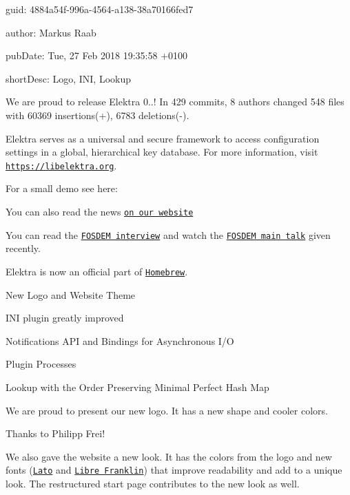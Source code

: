 
\begin{DoxyItemize}
\item guid\+: 4884a54f-\/996a-\/4564-\/a138-\/38a70166fed7
\item author\+: Markus Raab
\item pub\+Date\+: Tue, 27 Feb 2018 19\+:35\+:58 +0100
\item short\+Desc\+: Logo, I\+NI, Lookup
\end{DoxyItemize}

We are proud to release Elektra 0..! In 429 commits, 8 authors changed 548 files with 60369 insertions(+), 6783 deletions(-\/).

Elektra serves as a universal and secure framework to access configuration settings in a global, hierarchical key database. For more information, visit \href{https://libelektra.org}{\tt https\+://libelektra.\+org}.

For a small demo see here\+:

\href{https://asciinema.org/a/cantr04assr4jkv8v34uz9b8r}{\tt }

You can also read the news \href{https://www.libelektra.org/news/0.8.22-release}{\tt on our website}

You can read the \href{https://fosdem.org/2018/interviews/markus-raab/}{\tt F\+O\+S\+D\+EM interview} and watch the \href{https://fosdem.org/2018/schedule/event/elektra/}{\tt F\+O\+S\+D\+EM main talk} given recently.

Elektra is now an official part of \href{http://formulae.brew.sh/formula/elektra}{\tt Homebrew}.


\begin{DoxyItemize}
\item New Logo and Website Theme
\item I\+NI plugin greatly improved
\item Notifications A\+PI and Bindings for Asynchronous I/O
\item Plugin Processes
\item Lookup with the Order Preserving Minimal Perfect Hash Map
\end{DoxyItemize}

We are proud to present our new logo. It has a new shape and cooler colors.



Thanks to Philipp Frei!

We also gave the website a new look. It has the colors from the logo and new fonts (\href{https://fonts.google.com/specimen/Lato}{\tt Lato} and \href{https://fonts.google.com/specimen/Libre+Franklin}{\tt Libre Franklin}) that improve readability and add to a unique look. The restructured start page contributes to the new look as well.

